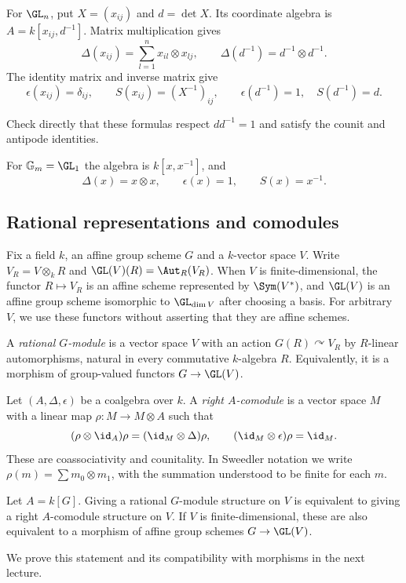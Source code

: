 \begin{example}
For $\GL_n$, put $X=(x_{ij})$ and $d=\det X$. Its coordinate algebra is
$A=k[x_{ij},d^{-1}]$. Matrix multiplication gives
\[
 \Delta(x_{ij})=\sum_{l=1}^n x_{il}\otimes x_{lj},\qquad
 \Delta(d^{-1})=d^{-1}\otimes d^{-1}.
\]
The identity matrix and inverse matrix give
\[
 \epsilon(x_{ij})=\delta_{ij},\qquad S(x_{ij})=(X^{-1})_{ij},
 \qquad \epsilon(d^{-1})=1,\quad S(d^{-1})=d.
\]
\end{example}
\begin{exercise}
Check directly that these formulas respect $dd^{-1}=1$ and satisfy the
counit and antipode identities.
\end{exercise}

\begin{example}
For $\mathbb G_m=\GL_1$ the algebra is $k[x,x^{-1}]$, and
\[
 \Delta(x)=x\otimes x,\qquad\epsilon(x)=1,\qquad S(x)=x^{-1}.
\]
\end{example}

\subsection{Rational representations and comodules}
Fix a field $k$, an affine group scheme $G$ and a $k$-vector space $V$.
Write $V_R=V\otimes_kR$ and
$\GL(V)(R)=\Aut_R(V_R)$. When $V$ is finite-dimensional, the functor
$R\mapsto V_R$ is an affine scheme represented by $\Sym(V^*)$, and
$\GL(V)$ is an affine group scheme isomorphic to $\GL_{\dim V}$ after
choosing a basis. For arbitrary $V$, we use these functors without asserting
that they are affine schemes.

\begin{definition}\label{RatRepDef}
A \emph{rational $G$-module} is a vector space $V$ with an action
$G(R)\curvearrowright V_R$ by $R$-linear automorphisms, natural in every
commutative $k$-algebra $R$. Equivalently, it is a morphism of group-valued
functors $G\to\GL(V)$.
\end{definition}

\begin{definition}\label{ComodDef}
Let $(A,\Delta,\epsilon)$ be a coalgebra over $k$. A \emph{right
$A$-comodule} is a vector space $M$ with a linear map
$\rho:M\to M\otimes A$ such that
\[
 (\rho\otimes\id_A)\rho=(\id_M\otimes\Delta)\rho,
 \qquad(\id_M\otimes\epsilon)\rho=\id_M.
\]
These are coassociativity and counitality. In Sweedler notation we write
$\rho(m)=\sum m_0\otimes m_1$, with the summation understood to be finite
for each $m$.
\end{definition}

\begin{theorem}\label{rep-comodule-dictionary}
Let $A=k[G]$. Giving a rational $G$-module structure on $V$ is equivalent
to giving a right $A$-comodule structure on $V$. If $V$ is finite-dimensional,
these are also equivalent to a morphism of affine group schemes
$G\to\GL(V)$.
\end{theorem}
We prove this statement and its compatibility with morphisms in the next
lecture.
